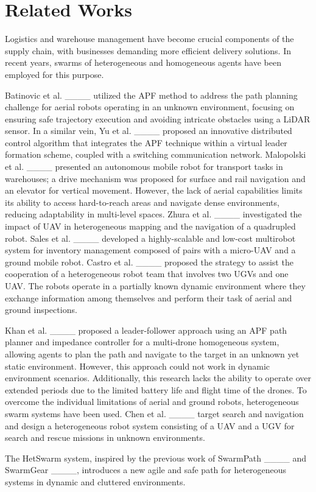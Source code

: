 \section{Related Works}
Logistics and warehouse management have become crucial components of the supply chain, with businesses demanding more efficient delivery solutions. In recent years, swarms of heterogeneous and homogeneous agents have been employed for this purpose. 

Batinovic et al. ____ utilized the APF method to address the path planning challenge for aerial robots operating in an unknown environment, focusing on ensuring safe trajectory execution and avoiding intricate obstacles using a LiDAR sensor. In a similar vein, Yu et al. ____ proposed an innovative distributed control algorithm that integrates the APF technique within a virtual leader formation scheme, coupled with a switching communication network.
Malopolski et al. ____ presented an autonomous mobile robot for transport tasks in warehouses; a drive mechanism was proposed for surface and rail navigation and an elevator for vertical movement. However, the lack of aerial capabilities limits its ability to access hard-to-reach areas and navigate dense environments, reducing adaptability in multi-level spaces.
Zhura et al. ____ investigated the impact of UAV in heterogeneous mapping and the navigation of a quadrupled robot. Sales et al. ____ developed a highly-scalable and low-cost multirobot system for inventory management composed of pairs with a micro-UAV and a ground mobile robot. Castro et al. ____ proposed the strategy to assist the cooperation of a heterogeneous robot team that involves two UGVs and one UAV. The robots operate in a partially known dynamic environment where they exchange information among themselves and perform their task of aerial and ground inspections.

Khan et al. ____ proposed a leader-follower approach using an APF path planner and impedance controller for a multi-drone homogeneous system, allowing agents to plan the path and navigate to the target in an unknown yet static environment. However, this approach could not work in dynamic environment scenarios. Additionally, this research lacks the ability to operate over extended periods due to the limited battery life and flight time of the drones.
To overcome the individual limitations of aerial and ground robots, heterogeneous swarm systems have been used. Chen et al. ____ target search and navigation and design a heterogeneous robot system consisting of a UAV and a UGV for search and rescue missions in unknown environments. 

The HetSwarm system, inspired by the previous work of SwarmPath ____ and SwarmGear ____, introduces a new agile and safe path for heterogeneous systems in dynamic and cluttered environments.